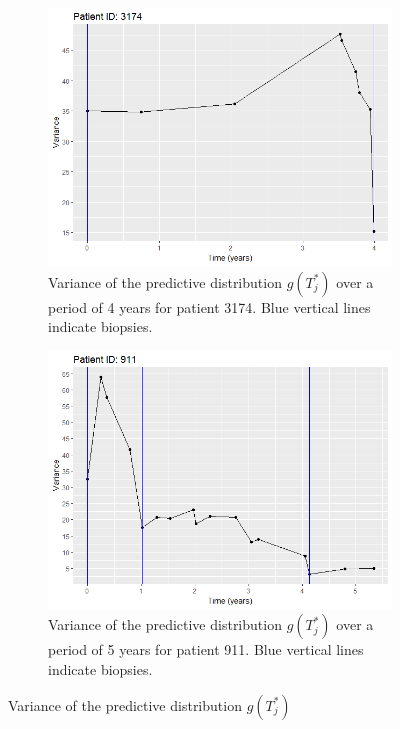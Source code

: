 \begin{figure}[!htb]
    \centering
    \captionsetup{justification=centering}
     \begin{subfigure}[b]{0.45\textwidth}
        \includegraphics[width=\textwidth]{images/variance/variance_pred_dist_3174.png}
        \caption{Variance of the predictive distribution $g(T^*_j)$ over a period of 4 years for patient 3174. Blue vertical lines indicate biopsies.}
        \label{fig : variance_pred_dist_3174}
    \end{subfigure}
    \begin{subfigure}[b]{0.45\textwidth}
        \includegraphics[width=\textwidth]{images/variance/variance_pred_dist_911.png}
        \caption{Variance of the predictive distribution $g(T^*_j)$ over a period of 5 years for patient 911. Blue vertical lines indicate biopsies.}
        \label{fig : variance_pred_dist_911}
    \end{subfigure}
    \label{fig : variance_pred_dist} 
    \caption{Variance of the predictive distribution $g(T^*_j)$}
\end{figure}

